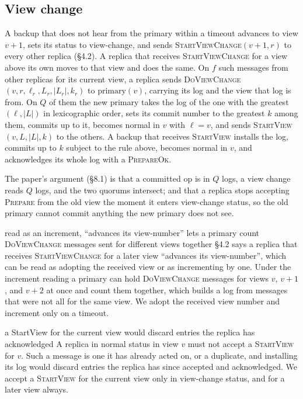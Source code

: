 \documentclass[11pt,a4paper]{article}
\theoremstyle{plain}
\theoremstyle{definition}
\theoremstyle{remark}
\newcommand{\msg}[1]{\textsc{#1}}
\newcommand{\dvc}{\msg{DoViewChange}}
\newcommand{\primary}{\mathrm{primary}}
\begin{document}
\subsection{View change}
\label{app:viewchange}

A backup that does not hear from the primary within a timeout advances to
view $v+1$, sets its status to view-change, and sends
\msg{StartViewChange}$(v+1, r)$ to every other replica (\S4.2). A replica
that receives \msg{StartViewChange} for a view above its own moves to
that view and does the same. On $f$ such messages from other replicas for
its current view, a replica sends
\msg{DoViewChange}$(v, r, \ell_r, L_r, |L_r|, k_r)$ to $\primary(v)$,
carrying its log and the view that log is from. On $Q$ of them the new
primary takes the log of the one with the greatest $(\ell, |L|)$ in
lexicographic order, sets its commit number to the greatest $k$ among
them, commits up to it, becomes normal in $v$
with $\ell = v$, and sends \msg{StartView}$(v, L, |L|, k)$ to the others.
A backup that receives \msg{StartView} installs the log, commits up to
$k$ subject to the rule above, becomes normal in $v$, and acknowledges
its whole log with a \msg{PrepareOk}.

The paper's argument (\S8.1) is that a committed op is in $Q$ logs, a
view change reads $Q$ logs, and the two quorums intersect; and that a
replica stops accepting \msg{Prepare} from the old view the moment it
enters view-change status, so the old primary cannot commit anything the
new primary does not see.

\begin{departure}{read as an increment, ``advances its view-number'' lets a primary count \dvc{} messages sent for different views together}
\S4.2 says a replica that
receives \msg{StartViewChange} for a later view ``advances its
view-number'', which can be read as adopting the received view or as
incrementing by one. Under the increment reading a primary can hold
\msg{DoViewChange} messages for views $v$, $v+1$, and $v+2$ at once and
count them together, which builds a log from messages that were not all
for the same view. We
adopt the received view number and increment only on a timeout.
\end{departure}

\begin{departure}{a StartView for the current view would discard entries the replica has acknowledged}
A replica in
normal status in view $v$ must not accept a \msg{StartView} for $v$. Such
a message is one it has already acted on, or a duplicate, and installing
its log would discard entries the replica has since accepted and
acknowledged. We accept a \msg{StartView} for the current view only in
view-change status, and for a later view always.
\end{departure}
\end{document}
